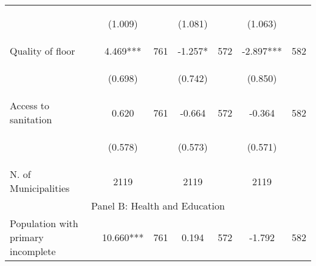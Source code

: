 \begin{tabular}{lcccccc}
\vspace{4pt} &  \begin{footnotesize}(1.009)\end{footnotesize}   & &
			    \begin{footnotesize}(1.081)\end{footnotesize}   & &
			    \begin{footnotesize}(1.063)\end{footnotesize}   &
			     \\          



Quality of floor   &  4.469***   &  761  &   -1.257*  &  572 &  -2.897***  &  582   \\

\vspace{4pt} &  \begin{footnotesize}(0.698)\end{footnotesize}   & &
			    \begin{footnotesize}(0.742)\end{footnotesize}   & &
			    \begin{footnotesize}(0.850)\end{footnotesize}   &
			     \\          

Access to sanitation   &  0.620   &  761  &   -0.664  &  572 &  -0.364  &  582   \\

\vspace{4pt} &  \begin{footnotesize}(0.578)\end{footnotesize}   & &
			    \begin{footnotesize}(0.573)\end{footnotesize}   & &
			    \begin{footnotesize}(0.571)\end{footnotesize}   &
			     \\          

N. of Municipalities  &   2119   &  &  2119    & &  2119  &    \\

\hline		
\multicolumn{7}{c}{Panel B: Health and Education}   \\                                                          


Population with primary incomplete   &  10.660***   &  761  &   0.194  &  572 &  -1.792  &  582   \\



\end{tabular}
